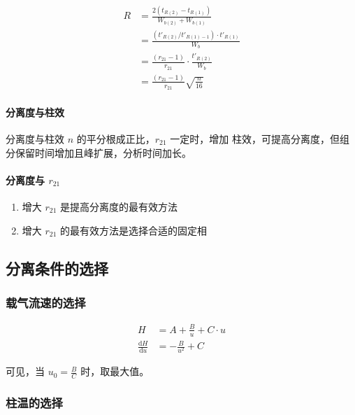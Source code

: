 \begin{align}
    R & = \frac{2\left(t_{R(2)} - t_{R(1)}\right)}{W_{b(2)} + W_{b(1)}}        \\
      & = \frac{\left( t'_{R(2)} / t'_{R(1) - 1} \right) \cdot t'_{R(1)}}{W_b} \\
      & = \frac{\left(r_{21} - 1\right)}{r_{21}} \cdot \frac{t'_{R(2)}}{W_b}   \\
      & = \frac{\left(r_{21} - 1\right)}{r_{21}} \sqrt{\frac{n}{16}}
\end{align}

\paragraph{分离度与柱效} 分离度与柱效 $n$ 的平分根成正比，$r_{21}$ 一定时，增加
柱效，可提高分离度，但组分保留时间增加且峰扩展，分析时间加长。

\paragraph{分离度与 $r_{21}$}

\begin{enumerate}
    \item 增大 $r_{21}$ 是提高分离度的最有效方法
    \item 增大 $r_{21}$ 的最有效方法是选择合适的固定相
\end{enumerate}

\subsection{分离条件的选择}

\subsubsection{载气流速的选择}

\begin{align}
    H                               & = A + \frac{B}{u} + C \cdot u \\
    \frac{\mathrm d H}{\mathrm d u} & = - \frac{B}{u^2} + C
\end{align}

可见，当 $ u_0 = \frac{B}{C} $ 时，取最大值。

\subsubsection{柱温的选择}


